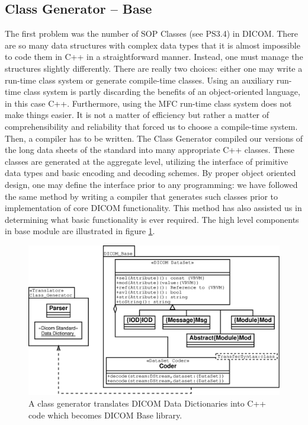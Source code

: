 \documentclass[a4paper,10pt]{article}
\begin{document}
\subsection{Class Generator -- Base}

The first problem was the number of SOP Classes (see PS3.4) in DICOM. There
are so many data structures with complex data types that it is almost
impossible to code them in C++ in a straightforward manner. Instead, one
must manage the structures slightly differently. There are really two
choices: either one may write a run-time class system or generate
compile-time classes. Using an auxiliary run-time class system is partly
discarding the benefits of an object-oriented language, in this case C++.
Furthermore, using the MFC run-time class system does not make things
easier. It is not a matter of efficiency but rather a matter of
comprehensibility and reliability that forced us to choose a compile-time
system. Then, a compiler has to be written. The Class Generator compiled our
versions of the long data sheets of the standard into many appropriate C++
classes. These classes are generated at the aggregate level, utilizing the
interface of primitive data types and basic encoding and decoding schemes.
By proper object oriented design, one may define the interface prior to any
programming: we have followed the same method by writing a compiler that
generates such classes prior to implementation of core DICOM functionality.
This method has also assisted us in determining what basic functionality is
ever required. The high level components in base module are
illustrated in figure \ref{fig:classgen}.

\begin{figure}[htbp]
  \begin{center}
    \includegraphics[scale=0.3]{medic-classgen.eps}
    \caption{A class generator translates DICOM Data Dictionaries into
      C++ code which becomes DICOM Base library.}
    \label{fig:classgen}
  \end{center}
\end{figure}
\end{document}

